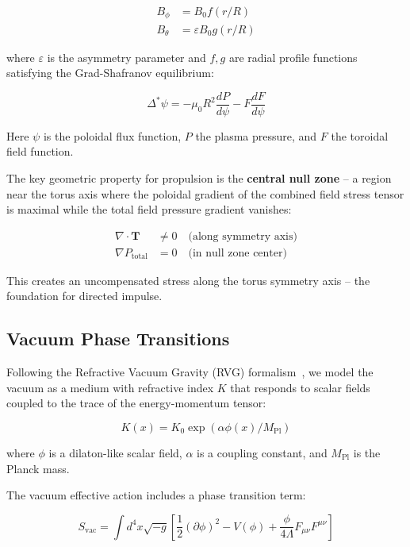 \documentclass[12pt,a4paper]{article}
\begin{document}
\begin{align}
B_\phi &= B_0 f(r/R) \\
B_\theta &= \varepsilon B_0 g(r/R)
\end{align}

where $\varepsilon$ is the asymmetry parameter and $f,g$ are radial profile functions satisfying the Grad-Shafranov equilibrium:

\begin{equation}
\Delta^* \psi = -\mu_0 R^2 \frac{dP}{d\psi} - F\frac{dF}{d\psi}
\label{eq:gradshafranov}
\end{equation}

Here $\psi$ is the poloidal flux function, $P$ the plasma pressure, and $F$ the toroidal field function.

The key geometric property for propulsion is the \textbf{central null zone} -- a region near the torus axis where the poloidal gradient of the combined field stress tensor is maximal while the total field pressure gradient vanishes:

\begin{align}
\nabla \cdot \mathbf{T} &\neq 0 \quad \text{(along symmetry axis)} \\
\nabla P_{\text{total}} &= 0 \quad \text{(in null zone center)}
\end{align}

This creates an uncompensated stress along the torus symmetry axis -- the foundation for directed impulse.

\subsection{Vacuum Phase Transitions}

Following the Refractive Vacuum Gravity (RVG) formalism~\cite{hofseth2026}, we model the vacuum as a medium with refractive index $K$ that responds to scalar fields coupled to the trace of the energy-momentum tensor:

\begin{equation}
K(x) = K_0 \exp(\alpha \phi(x) / M_{\text{Pl}})
\label{eq:refractive}
\end{equation}

where $\phi$ is a dilaton-like scalar field, $\alpha$ is a coupling constant, and $M_{\text{Pl}}$ is the Planck mass.

The vacuum effective action includes a phase transition term:

\begin{equation}
S_{\text{vac}} = \int d^4x \sqrt{-g} \left[ \frac{1}{2}(\partial\phi)^2 - V(\phi) + \frac{\phi}{4\Lambda} F_{\mu\nu}F^{\mu\nu} \right]
\label{eq:action}
\end{equation}
\end{document}
